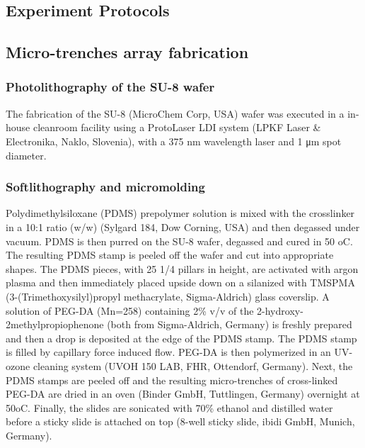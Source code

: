 \documentclass[pdftex,12pt,a4paper]{report}
\begin{document}






\begin{appendices}

\chapter{Experiment Protocols}

\section{Micro-trenches array fabrication}
\label{appendix:microtrench}

\subsection*{Photolithography of the SU-8 wafer}

The fabrication of the SU-8 (MicroChem Corp, USA) wafer was executed in a in-house cleanroom facility using a ProtoLaser LDI system (LPKF Laser \& Electronika, Naklo, Slovenia), with a 375 nm wavelength laser and 1 μm spot diameter.

\subsection*{Softlithography and micromolding}

Polydimethylsiloxane (PDMS) prepolymer solution is mixed with the crosslinker in a 10:1 ratio (w/w) (Sylgard 184, Dow Corning, USA) and then degassed under vacuum. PDMS is then purred on the SU-8 wafer, degassed and cured in 50 oC. The resulting PDMS stamp is peeled off the wafer and cut into appropriate shapes. The PDMS pieces, with 25 1/4 pillars in height, are activated with argon plasma and then immediately placed upside down on a silanized with TMSPMA (3-(Trimethoxysilyl)propyl methacrylate, Sigma-Aldrich) glass coverslip. A solution of PEG-DA (Mn=258) containing 2\% v/v of the 2-hydroxy-2methylpropiophenone (both from Sigma-Aldrich, Germany) is freshly prepared and then a drop is deposited at the edge of the PDMS stamp. The PDMS stamp is filled by capillary force induced flow. PEG-DA is then polymerized in an UV-ozone cleaning system (UVOH 150 LAB, FHR, Ottendorf, Germany). Next, the PDMS stamps are peeled off and the resulting micro-trenches of cross-linked PEG-DA are dried in an oven (Binder GmbH, Tuttlingen, Germany) overnight at 50oC. Finally, the slides are sonicated with 70\% ethanol and distilled water before a sticky slide is attached on top (8-well sticky slide, ibidi GmbH, Munich, Germany).


\end{appendices}
\end{document}
